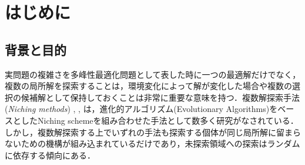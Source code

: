 \documentclass[a4j,11pt]{jarticle}
\def\proposed{DNRBA}
\def\proposedJ{適応的個体間距離に基づく複数解探索型Bat Algorithm}
\begin{document}

\newpage
\tableofcontents

\newpage
\setcounter{page}{1}
\pagestyle{fancy}
\cfoot{\thepage}
\chead{}
\lhead{}
\rhead{{\small \leftmark\ \ \ \ $-$\ \ \ \ \rightmark}}

\section{はじめに}
\subsection{背景と目的}
実問題の複雑さを多峰性最適化問題として表した時に一つの最適解だけでなく，複数の局所解を探索することは，環境変化によって解が変化した場合や複数の選択の候補解として保持しておくことは非常に重要な意味を持つ．複数解探索手法({\it Niching methods}) \cite{dADE}, \cite{nea}, \cite{CDE} は，進化的アルゴリズム(Evolutionary Algorithms)をベースとしたNiching schemeを組み合わせた手法として数多く研究がなされている．
しかし，複数解探索する上でいずれの手法も探索する個体が同じ局所解に留まらないための機構が組み込まれているだけであり，未探索領域への探索はランダムに依存する傾向にある．
\end{document}
